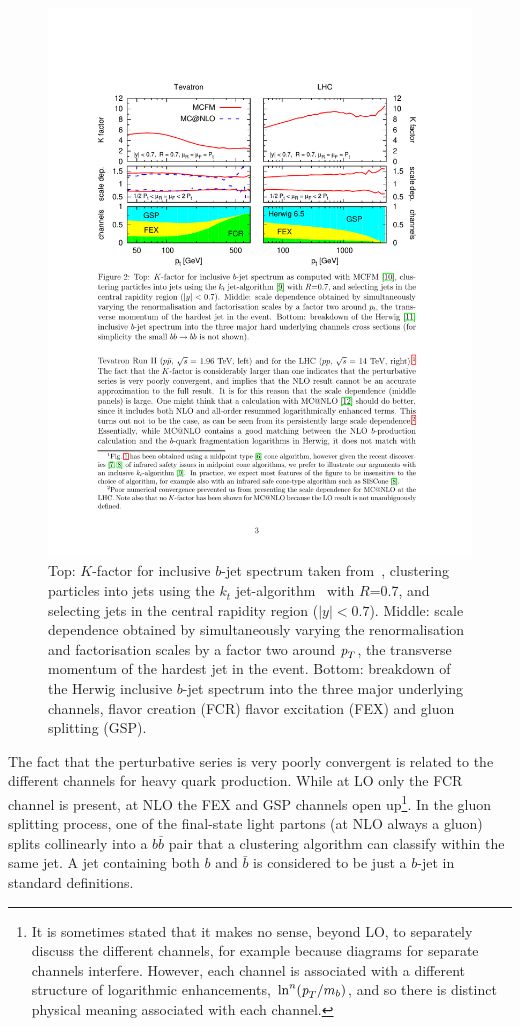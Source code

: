 \begin{figure}[tp]
\centering
\includegraphics[height=0.7\textwidth,viewport=300 410 530 690,clip]{FIGS/bjets_qcd.pdf}
  \caption{Top: $K$-factor for inclusive $b$-jet spectrum taken from~\cite{Salam.AccurateHQ}, clustering particles into jets using the $k_t$   jet-algorithm~\cite{kt1}  with $R$=0.7, and selecting jets in the central rapidity region ($|y| <0.7$). Middle: scale dependence obtained by simultaneously varying the renormalisation and factorisation scales by a factor two around ${\emph{p}_{T}}$, the transverse momentum of the hardest jet in the event. Bottom: breakdown of the Herwig \cite{Herwig} inclusive $b$-jet spectrum into the three major underlying channels, flavor creation (FCR) flavor excitation (FEX) and gluon splitting (GSP).}
  \label{fig:bjets_qcd}
\end{figure}

The fact that the perturbative series is very poorly convergent is related to the different channels for heavy quark production. 
While at LO only the FCR channel is present, at NLO the FEX and GSP channels open up\footnote{It is sometimes stated that it makes no sense, beyond LO, to separately discuss the different channels, for example because diagrams for separate channels interfere. However, each channel is associated with a different structure of logarithmic enhancements, $\ln^n ({\emph{p}_{T}} / m_b )$, and so there is distinct physical meaning associated with each channel.}.  %
 In the gluon splitting process, one of the final-state light partons (at NLO always a gluon) splits collinearly into a $b\bar{b}$ pair that a clustering algorithm can classify within the same jet. A jet containing both $b$ and $\bar{b}$ is considered to be just a $b$-jet in standard definitions.

